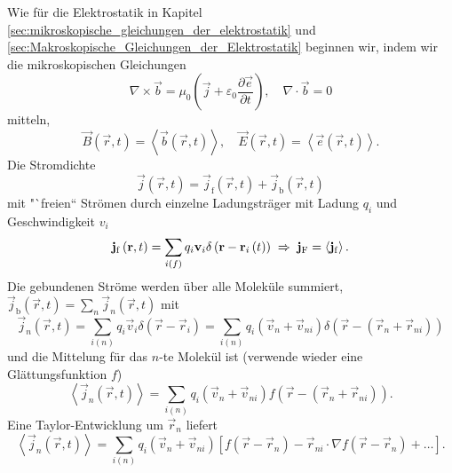 Wie für die Elektrostatik in Kapitel \ref{sec:mikroskopische_gleichungen_der_elektrostatik} und \ref{sec:Makroskopische_Gleichungen_der_Elektrostatik} beginnen wir, indem wir die mikroskopischen Gleichungen
\begin{equation*}
	\nabla\times \vec {b}=\mu _{0}\left(\vec {j}+\varepsilon _{0}\frac{\partial \vec {e}}{\partial t}\right), \quad\nabla\cdot \vec {b}=0
\end{equation*}
mitteln,
\begin{equation*}
	\vec {B}\left(\vec {r},t\right)=\left\langle \vec {b}\left(\vec {r},t\right)\right\rangle ,\quad \vec {E}\left(\vec {r},t\right)=\left\langle \vec {e}\left(\vec {r},t\right)\right\rangle .
\end{equation*}
Die Stromdichte
\begin{equation*}
	\vec {j}\left(\vec {r},t\right)=\vec {j}_{\mathrm{f}}\left(\vec {r},t\right)+\vec {j}_{\mathrm{b}}\left(\vec {r},t\right)
\end{equation*}
mit "`freien`` Strömen durch einzelne Ladungsträger mit Ladung $q_{i}$ und Geschwindigkeit $v_{i }$
\begin{equation*}
	\mathbf{j}_{\mathrm{f}}\left(\mathbf{r},t\right)=\sum _{i\left(f\right)}q_{i}\mathbf{v}_{i}\delta \left(\mathbf{r}-\mathbf{r}_{i}\left(t\right)\right)\;\Rightarrow\; \mathbf{j}_{\mathrm{F}}=\left\langle \mathbf{j}_{\mathrm{f}}\right\rangle .
\end{equation*}
Die gebundenen Ströme werden über alle Moleküle summiert, $\vec {j}_{\mathrm{b}}\left(\vec {r},t\right)=\sum _{n}\vec {j}_{n}\left(\vec {r},t\right)$ mit
\begin{equation*}
	\vec {j}_{n}\left(\vec {r},t\right)=\sum _{i\left(n\right)}q_{i}\vec {v}_{i}\delta \left(\vec {r}-\vec {r}_{i}\right)=\sum _{i\left(n\right)}q_{i}\left(\vec {v}_{n}+\vec {v}_{ni}\right)\delta \left(\vec {r}-\left(\vec {r}_{n}+\vec {r}_{ni}\right)\right)
\end{equation*}
und die Mittelung für das $n$-te Molekül ist (verwende wieder eine Glättungsfunktion $f$)
\begin{equation*}
	\left\langle \vec {j}_{n}\left(\vec {r},t\right)\right\rangle =\sum _{i\left(n\right)}q_{i}\left(\vec {v}_{n}+\vec {v}_{ni}\right)f\left(\vec {r}-\left(\vec {r}_{n}+\vec {r}_{ni}\right)\right).
\end{equation*}
Eine Taylor-Entwicklung um $\vec {r}_{n}$ liefert
\begin{equation*}
	\left\langle \vec {j}_{n}\left(\vec {r},t\right)\right\rangle =\sum _{i\left(n\right)}q_{i}\left(\vec {v}_{n}+\vec {v}_{ni}\right)\left[f\left(\vec {r}-\vec {r}_{n}\right)-\vec {r}_{ni}\cdot \nabla f\left(\vec {r}-\vec {r}_{n}\right)+\ldots \right].
\end{equation*}
